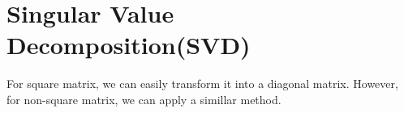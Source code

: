 \documentclass{article}
\begin{document}
 
\section{Singular Value Decomposition(SVD)}
For square matrix, we can easily transform it into a diagonal matrix. However, for non-square matrix, we can apply a simillar method.
\end{document}
